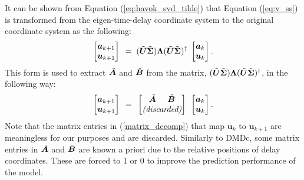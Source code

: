     It can be shown from Equation (\ref{eq:havok_svd_tilde}) that Equation (\ref{eq:v_ss}) is transformed from the eigen-time-delay coordinate system to the original coordinate system as the following:
    \begin{equation} \label{eq:v_ss_a} 
        \begin{bmatrix}
            \bm{a}_{k+1}  \\  \bm{u}_{k+1} 
        \end{bmatrix}
    \phantom{.} = \phantom{.} (\Tilde{\bm{U}} \Tilde{\bm{\Sigma}}) \bm{\Lambda} (\Tilde{\bm{U}}  \Tilde{\bm{\Sigma}})^{\dagger} \phantom{.}
        \begin{bmatrix}
            \bm{a}_{k}  \\  \bm{u}_{k} 
        \end{bmatrix} .
    \end{equation}    
    This form is used to extract $\Tilde{\bm{A}}$ and $\Tilde{\bm{B}}$ from the matrix,
    \( 
        (\Tilde{\bm{U}} \Tilde{\bm{\Sigma}}) \bm{\Lambda} (\Tilde{\bm{U}}  \Tilde{\bm{\Sigma}})^{\dagger}
    \), in the following way:
    \begin{equation} \label{matrix_decomp}
        \begin{bmatrix}
            \bm{a}_{k+1}  \\  \bm{u}_{k+1} 
        \end{bmatrix}
        \phantom{.} = \phantom{.} 
        \begin{bmatrix}
            \Tilde{\bm{A}} \phantom{.....} \Tilde{\bm{B}} \\
            \textit{(discarded)}
        \end{bmatrix}
        \phantom{.}
        \begin{bmatrix}
            \bm{a}_{k}  \\  \bm{u}_{k} 
        \end{bmatrix}.
    \end{equation}    
    Note that the matrix entries in (\ref{matrix_decomp}) that map $\bm{u}_k$ to $\bm{u}_{k+1}$ are meaningless for our purposes and are discarded.
    Similarly to DMDc, some matrix entries in $\Tilde{\bm{A}}$ and $\Tilde{\bm{B}}$ are known a priori due to the relative positions of delay coordinates. These are forced to 1 or 0 to improve the prediction performance of the model.
    
